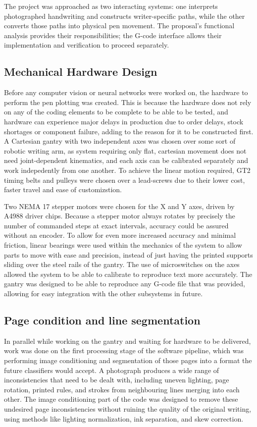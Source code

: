 \label{sec:approach}
The project was approached as two interacting systems: one interprets photographed handwriting and constructs writer-specific paths, while the other converts those paths into physical pen movement. The proposal's functional analysis provides their responsibilities; the G-code interface allows their implementation and verification to proceed separately.

\subsection{Mechanical Hardware Design}

Before any computer vision or neural networks were worked on, the hardware to perform the pen plotting was created. This is because the hardware does not rely on any of the coding elements to be complete to be able to be tested, and hardware can experience major delays in production due to order delays, stock shortages or component failure, adding to the reason for it to be constructed first. A Cartesian gantry with two independent axes was chosen over some sort of robotic writing arm, as system requiring only flat, cartesian movement does not need joint-dependent kinematics, and each axis can be calibrated separately and work indepedently from one another. To achieve the linear motion required, GT2 timing belts and pulleys were chosen over a lead-screws due to their lower cost, faster travel and ease of customizstion. 

Two NEMA 17 stepper motors were chosen for the X and Y axes, driven by A4988 driver chips. Because a stepper motor always rotates by precisely the number of commanded steps at exact intervals, accuracy could be assured without an encoder. To allow for even more increased accuracy and minimal friction, linear bearings were used within the mechanics of the system to allow parts to move with ease and precision, instead of just having the printed supports sliding over the steel rails of the gantry. The use of microswitches on the axes allowed the system to be able to calibrate to reproduce text more accurately. The gantry was designed to be able to reproduce any G-code file that was provided, allowing for easy integration with the other subsystems in future.

\subsection{Page condition and line segmentation}

In parallel while working on the gantry and waiting for hardware to be delivered, work was done on the first processing stage of the software pipeline, which was performing image conditioning and segmentation of those pages into a format the future classifiers would accept. A photograph produces a wide range of inconsistencies that need to be dealt with, including uneven lighting, page rotation, printed rules, and strokes from neighbouring lines merging into each other. The image conditioning part of the code was designed to remove these undesired page inconsistencies without ruining the quality of the original writing, using methods like lighting normalization, ink separation, and skew correction. 

